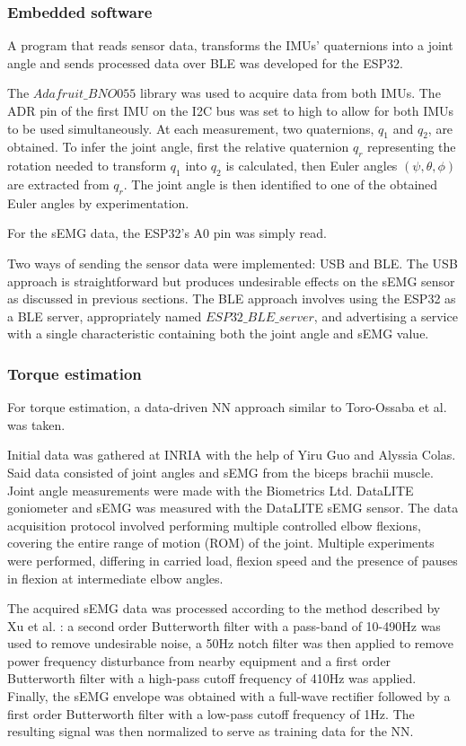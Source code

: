 \subsubsection{Embedded software}
A program that reads sensor data, transforms the IMUs' quaternions 
into a joint angle and sends processed data over BLE was developed for the 
ESP32.  

The $Adafruit\_BNO055$ library was used to acquire data from both IMUs. The ADR 
pin of the first IMU on the I2C bus was set to high to allow for both IMUs to 
be used simultaneously. At each measurement, two quaternions, $q_1$ and $q_2$, 
are obtained. To infer the joint angle, first the relative quaternion $q_r$ 
representing the rotation needed to transform $q_1$ into $q_2$ is calculated, 
then Euler angles $(\psi, \theta, \phi)$ are extracted from $q_r$. The joint 
angle is then identified to one of the obtained Euler angles by experimentation.  

For the sEMG data, the ESP32's A0 pin was simply read.  

Two ways of sending the sensor data were implemented: USB and BLE. The USB 
approach is straightforward but produces undesirable effects on the sEMG sensor 
as discussed in previous sections. The BLE approach involves using the ESP32 
as a BLE server, appropriately named $ESP32\_BLE\_server$, and advertising a 
service with a single characteristic containing both the joint angle and sEMG 
value. 
\FloatBarrier

\subsubsection{Torque estimation}
For torque estimation, a data-driven NN approach similar to Toro-Ossaba et al. 
\cite{toro-ossaba_myoelectric_2024} was taken.  

Initial data was gathered at INRIA with the help of Yiru Guo and Alyssia Colas. 
Said data consisted of joint angles and sEMG from the biceps brachii muscle. 
Joint angle measurements were made with the Biometrics Ltd. DataLITE goniometer 
and sEMG was measured with the DataLITE sEMG sensor. The data acquisition protocol 
involved performing multiple controlled elbow flexions, covering the entire range 
of motion (ROM) of the joint. Multiple experiments were performed, differing in 
carried load, flexion speed and the presence of pauses in flexion at intermediate 
elbow angles.  

The acquired sEMG data was processed according to the method described by Xu et al. 
\cite{wu_adaptive_2023}: a second order Butterworth filter with a pass-band of 
10-490Hz was used to remove undesirable noise, a 50Hz notch filter was then applied 
to remove power frequency disturbance from nearby equipment and a first order 
Butterworth filter with a high-pass cutoff frequency of 410Hz was applied. Finally, 
the sEMG envelope was obtained with a full-wave rectifier followed by a first order 
Butterworth filter with a low-pass cutoff frequency of 1Hz. The resulting signal 
was then normalized to serve as training data for the NN.  

